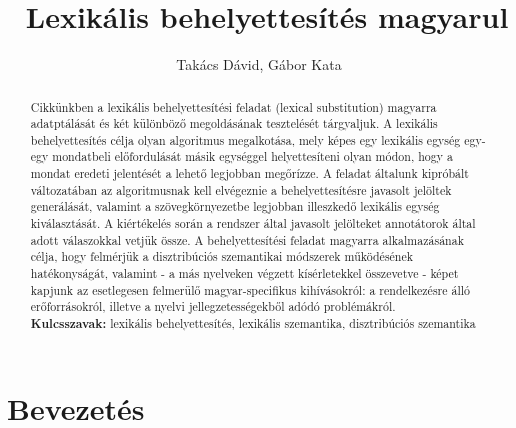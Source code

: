 \documentclass{llncs}
\begin{document}
\pagestyle{myheadings}
\def\leftmark{{\rm IV. Magyar Sz\'am\'\i t\'og\'epes Nyelv\'eszeti Konferencia}}
\def\rightmark{{\rm Szeged, 2015}}

\setcounter{page}{3}

\title{\ \break Lexik\'{a}lis behelyettes\'{i}t\'{e}s magyarul}
\author{Tak\'{a}cs D\'{a}vid, G\'{a}bor Kata}

\maketitle

\begin{abstract}
Cikk\"{u}nkben a lexik\'{a}lis behelyettes\'{i}t\'{e}si feladat (lexical substitution) magyarra adatpt\'{a}l\'{a}s\'{a}t \'{e}s k\'{e}t k\"{u}l\"{o}nb\"{o}z\H{o} megold\'{a}s\'{a}nak tesztel\'{e}s\'{e}t t\'{a}rgyaljuk. A lexik\'{a}lis behelyettes\'{i}t\'{e}s c\'{e}lja olyan algoritmus megalkot\'{a}sa, mely k\'{e}pes egy lexik\'{a}lis egys\'{e}g egy-egy mondatbeli el\H{o}fordul\'{a}s\'{a}t m\'{a}sik egys\'{e}ggel helyettes\'{i}teni olyan m\'{o}don, hogy a mondat eredeti jelent\'{e}s\'{e}t a lehet\H{o} legjobban meg\H{o}r\'{i}zze. A feladat \'{a}ltalunk kipr\'{o}b\'{a}lt v\'{a}ltozat\'{a}ban az algoritmusnak kell elv\'{e}geznie a behelyettes\'{i}t\'{e}sre javasolt jel\"{o}ltek gener\'{a}l\'{a}s\'{a}t, valamint a sz\"{o}vegk\"{o}rnyezetbe legjobban illeszked\H{o} lexik\'{a}lis egys\'{e}g kiv\'{a}laszt\'{a}s\'{a}t. A ki\'{e}rt\'{e}kel\'{e}s sor\'{a}n a rendszer \'{a}ltal javasolt jel\"{o}lteket annot\'{a}torok \'{a}ltal adott v\'{a}laszokkal vetj\"{u}k \"{o}ssze. A behelyettes\'{i}t\'{e}si feladat magyarra alkalmaz\'{a}s\'{a}nak c\'{e}lja, hogy felm\'{e}rj\"{u}k a disztrib\'{u}ci\'{o}s szemantikai m\'{o}dszerek m\H{u}k\"{o}d\'{e}s\'{e}nek hat\'{e}konys\'{a}g\'{a}t, valamint - a m\'{a}s nyelveken v\'{e}gzett k\'{i}s\'{e}rletekkel \"{o}sszevetve - k\'{e}pet kapjunk az esetlegesen felmer\"{u}l\H{o} magyar-specifikus kih\'{i}v\'{a}sokr\'{o}l: a rendelkez\'{e}sre \'{a}ll\'{o} er\H{o}forr\'{a}sokr\'{o}l, illetve a nyelvi jellegzetess\'{e}gekb\H{o}l ad\'{o}d\'{o} probl\'{e}m\'{a}kr\'{o}l.
\\[2mm]
{\bf Kulcsszavak:} lexik\'{a}lis behelyettes\'{i}t\'{e}s, lexik\'{a}lis szemantika, disztrib\'{u}ci\'{o}s szemantika
\end{abstract}

%
\section{Bevezet\'es}
%
\end{document}
